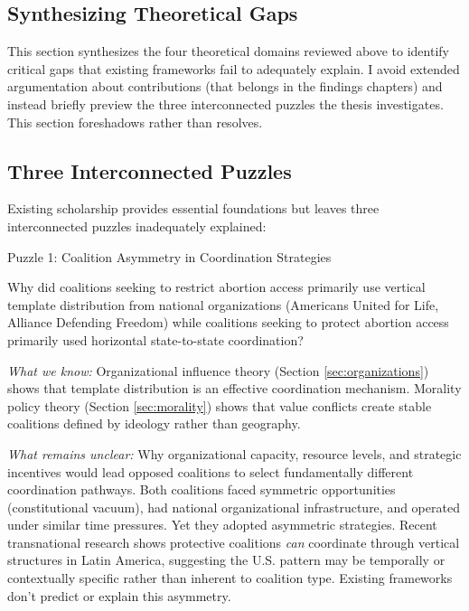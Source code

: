 \subsection{Synthesizing Theoretical Gaps}

This section synthesizes the four theoretical domains reviewed above to identify critical gaps that existing frameworks fail to adequately explain. I avoid extended argumentation about contributions (that belongs in the findings chapters) and instead briefly preview the three interconnected puzzles the thesis investigates. This section foreshadows rather than resolves.

\subsection{Three Interconnected Puzzles}

Existing scholarship provides essential foundations but leaves three interconnected puzzles inadequately explained:

Puzzle 1: Coalition Asymmetry in Coordination Strategies

Why did coalitions seeking to restrict abortion access primarily use vertical template distribution from national organizations (Americans United for Life, Alliance Defending Freedom) while coalitions seeking to protect abortion access primarily used horizontal state-to-state coordination?

\emph{What we know:} Organizational influence theory (Section \ref{sec:organizations}) shows that template distribution is an effective coordination mechanism. Morality policy theory (Section \ref{sec:morality}) shows that value conflicts create stable coalitions defined by ideology rather than geography.

\emph{What remains unclear:} Why organizational capacity, resource levels, and strategic incentives would lead opposed coalitions to select fundamentally different coordination pathways. Both coalitions faced symmetric opportunities (constitutional vacuum), had national organizational infrastructure, and operated under similar time pressures. Yet they adopted asymmetric strategies. Recent transnational research shows protective coalitions \emph{can} coordinate through vertical structures in Latin America, \parencite{fernandezandersonDiffusingStrategiesNorthSouth2025} suggesting the U.S. pattern may be temporally or contextually specific rather than inherent to coalition type. Existing frameworks don't predict or explain this asymmetry.

